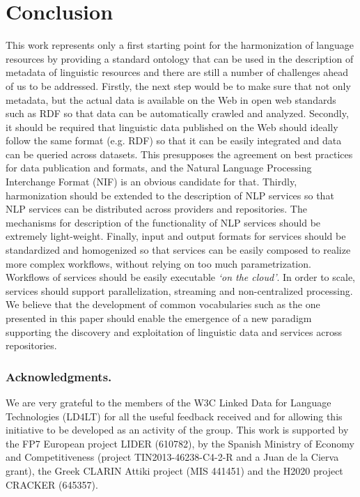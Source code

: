 \documentclass{llncs}
\begin{document}
\section{Conclusion}
\label{sec:conclusion}
This work represents only a first starting point for the harmonization of
language resources by providing a standard ontology that can be used in the
description of metadata of linguistic resources
and there are still a number of challenges
ahead of us to be addressed. Firstly, the next step would be to make sure that
not only metadata, but the actual data is available on the Web in open web
standards such as RDF so that data can be automatically crawled and analyzed.
Secondly, it should be required that linguistic data published on the
Web should ideally follow the same format (e.g. RDF) so that it can be
easily integrated and data can be queried across datasets. This presupposes
the agreement on best practices for data publication and formats, and the
Natural Language Processing Interchange Format
(NIF)\cite{hellmann2013integrating} is an obvious candidate for that. Thirdly,
harmonization should be extended to the description of NLP services so that NLP
services can be distributed across providers and repositories. The mechanisms for
description of the functionality of NLP services should be extremely
light-weight. Finally, input and output formats for services should be
standardized and homogenized so that services can be easily composed to realize
more complex workflows, without relying on too much parametrization. Workflows
of services should be easily executable \emph{`on the cloud'}. In order to
scale, services should support parallelization, streaming and 
non-centralized processing. %
We believe that the development of common vocabularies
such as the one presented in this paper should enable the emergence of a new paradigm supporting the discovery and exploitation of linguistic data and services across repositories.


\subsubsection*{Acknowledgments.} We are very grateful to the members of the W3C Linked Data for Language Technologies (LD4LT) for all the useful feedback received and for allowing this initiative to be developed as an activity of the group. This work is supported by the FP7 European project LIDER (610782), by the Spanish Ministry of Economy and Competitiveness (project TIN2013-46238-C4-2-R and a Juan de la Cierva grant), the Greek CLARIN Attiki project (MIS 441451) and the H2020 project CRACKER (645357).


\end{document}
